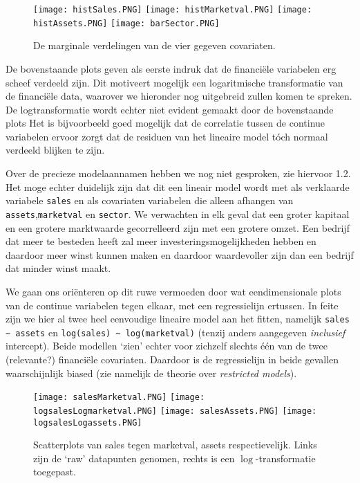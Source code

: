 \documentclass[a4paper, notitlepage]{report}
\begin{document}
\begin{figure}
\begin{center}
\texttt{[image: histSales.PNG]}
\texttt{[image: histMarketval.PNG]}
\texttt{[image: histAssets.PNG]}
\texttt{[image: barSector.PNG]}
\end{center}
\caption{De marginale verdelingen van de vier gegeven covariaten.}
\end{figure}

  De bovenstaande plots geven als eerste indruk dat de financi\"ele variabelen erg scheef verdeeld zijn. Dit motiveert mogelijk een logaritmische transformatie van de financi\"ele data, waarover we hieronder nog uitgebreid zullen komen te spreken. De logtransformatie wordt echter niet evident gemaakt door de bovenstaande plots Het is bijvoorbeeld goed mogelijk dat de correlatie tussen de continue variabelen ervoor zorgt dat de residuen van het lineaire model t\' och normaal verdeeld blijken te zijn.
  
  Over de precieze modelaannamen hebben we nog niet gesproken, zie hiervoor 1.2. Het moge echter duidelijk zijn dat dit een lineair model wordt met als verklaarde variabele \verb!sales! en als covariaten variabelen die alleen afhangen van \verb!assets!,\verb!marketval! en \verb!sector!. We verwachten in elk geval dat een groter kapitaal en een grotere marktwaarde gecorrelleerd zijn met een grotere omzet. Een bedrijf dat meer te besteden heeft zal meer investeringsmogelijkheden hebben en daardoor meer winst kunnen maken en daardoor waardevoller zijn dan een bedrijf dat minder winst maakt. 
  
  We gaan ons ori\"enteren op dit ruwe vermoeden door wat eendimensionale plots van de continue variabelen tegen elkaar, met een regressielijn ertussen. In feite zijn we hier al twee heel eenvoudige lineaire model aan het fitten, namelijk \verb!sales ~ assets! en \verb!log(sales) ~ log(marketval)! (tenzij anders aangegeven \emph{inclusief} intercept). Beide modellen `zien' echter voor zichzelf slechts \' e\' en van de twee (relevante?) financi\"ele covariaten. Daardoor is de regressielijn in beide gevallen waarschijnlijk biased (zie namelijk de theorie over \emph{restricted models}).
  
\begin{figure}[H]
\begin{center}
\texttt{[image: salesMarketval.PNG]}
\texttt{[image: logsalesLogmarketval.PNG]}
\texttt{[image: salesAssets.PNG]}
\texttt{[image: logsalesLogassets.PNG]}
\end{center}
\caption{Scatterplots van sales tegen marketval, assets respectievelijk. Links zijn de `raw' datapunten genomen, rechts is een $\log$-transformatie toegepast.}
\end{figure}
\end{document}
